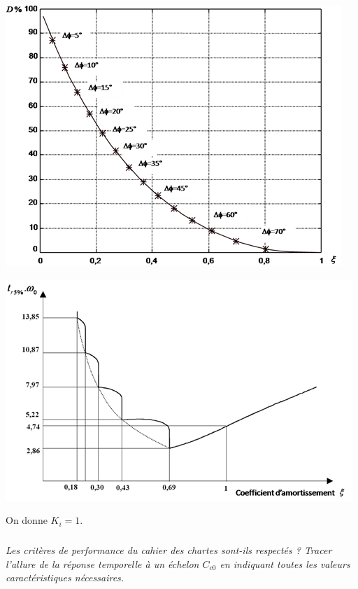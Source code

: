 \documentclass[10pt,fleqn]{article} %
\begin{document}
\begin{multicols}{2}
\begin{center}
\includegraphics[width=\linewidth]{images/im_01}
\end{center}

\begin{center}
\includegraphics[width=\linewidth]{images/im_02}
\end{center}
%
%
%

%

On donne $K_i=1$. 
\subparagraph{}
\textit{Les critères de performance du cahier des chartes sont-ils respectés ?
Tracer l’allure de la réponse temporelle à un échelon $C_{c0}$ en indiquant toutes les valeurs caractéristiques
nécessaires.}

\ifprof
\begin{corrige}

\end{corrige}
\else
\fi



\end{multicols}
\end{document}
